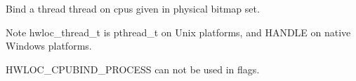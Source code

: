 Bind a thread {\ttfamily thread} on cpus given in physical bitmap {\ttfamily set}. 

\begin{DoxyNote}{Note}
{\ttfamily hwloc\_\-thread\_\-t} is {\ttfamily pthread\_\-t} on Unix platforms, and {\ttfamily HANDLE} on native Windows platforms.

HWLOC\_\-CPUBIND\_\-PROCESS can not be used in {\ttfamily flags}. 
\end{DoxyNote}
